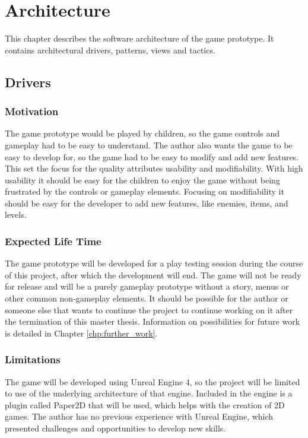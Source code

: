\chapter{Architecture}
This chapter describes the software architecture of the game prototype. It contains architectural drivers, patterns, views and tactics.


\section{Drivers}
\subsection{Motivation}
The game prototype would be played by children, so the game controls and gameplay had to be easy to understand. The author also wants the game to be easy to develop for, so the game had to be easy to modify and add new features. This set the focus for the quality attributes usability and modifiability. With high usability it should be easy for the children to enjoy the game without being frustrated by the controls or gameplay elements. Focusing on modifiability it should be easy for the developer to add new features, like enemies, items, and levels.

\subsection{Expected Life Time}
The game prototype will be developed for a play testing session during the course of this project, after which the development will end. The game will not be ready for release and will be a purely gameplay prototype without a story, menus or other common non-gameplay elements. It should be possible for the author or someone else that wants to continue the project to continue working on it after the termination of this master thesis. Information on possibilities for future work is detailed in Chapter \ref{chp:further_work}.

\subsection{Limitations}
The game will be developed using Unreal Engine 4, so the project will be limited to use of the underlying architecture of that engine. Included in the engine is a plugin called Paper2D that will be used, which helps with the creation of 2D games. The author has no previous experience with Unreal Engine, which presented challenges and opportunities to develop new skills. 


